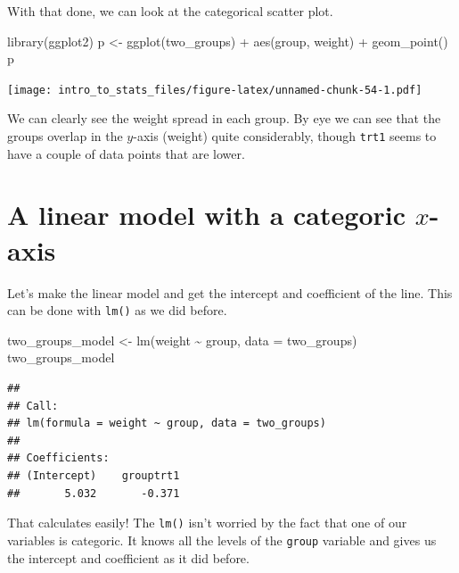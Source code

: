 \documentclass[
]{book}
\newenvironment{Shaded}{\begin{snugshade}}{\end{snugshade}}
\newcommand{\AttributeTok}[1]{\textcolor[rgb]{0.77,0.63,0.00}{#1}}
\newcommand{\FunctionTok}[1]{\textcolor[rgb]{0.00,0.00,0.00}{#1}}
\newcommand{\NormalTok}[1]{#1}
\newcommand{\OtherTok}[1]{\textcolor[rgb]{0.56,0.35,0.01}{#1}}
\newcommand{\SpecialCharTok}[1]{\textcolor[rgb]{0.00,0.00,0.00}{#1}}
\begin{document}
With that done, we can look at the categorical scatter plot.

\begin{Shaded}
\begin{Highlighting}[]
\FunctionTok{library}\NormalTok{(ggplot2)}
\NormalTok{p }\OtherTok{\textless{}{-}} \FunctionTok{ggplot}\NormalTok{(two\_groups) }\SpecialCharTok{+} \FunctionTok{aes}\NormalTok{(group, weight) }\SpecialCharTok{+} \FunctionTok{geom\_point}\NormalTok{()}
\NormalTok{p}
\end{Highlighting}
\end{Shaded}

\texttt{[image: intro\_to\_stats\_files/figure-latex/unnamed-chunk-54-1.pdf]}

We can clearly see the weight spread in each group. By eye we can see that the groups overlap in the \(y\)-axis (weight) quite considerably, though \texttt{trt1} seems to have a couple of data points that are lower.

\hypertarget{a-linear-model-with-a-categoric-x-axis}{%
\section{\texorpdfstring{A linear model with a categoric \(x\)-axis}{A linear model with a categoric x-axis}}\label{a-linear-model-with-a-categoric-x-axis}}

Let's make the linear model and get the intercept and coefficient of the line. This can be done with \texttt{lm()} as we did before.

\begin{Shaded}
\begin{Highlighting}[]
\NormalTok{two\_groups\_model }\OtherTok{\textless{}{-}} \FunctionTok{lm}\NormalTok{(weight }\SpecialCharTok{\textasciitilde{}}\NormalTok{ group, }\AttributeTok{data =}\NormalTok{ two\_groups)}
\NormalTok{two\_groups\_model}
\end{Highlighting}
\end{Shaded}

\begin{verbatim}
## 
## Call:
## lm(formula = weight ~ group, data = two_groups)
## 
## Coefficients:
## (Intercept)    grouptrt1  
##       5.032       -0.371
\end{verbatim}

That calculates easily! The \texttt{lm()} isn't worried by the fact that one of our variables is categoric. It knows all the levels of the \texttt{group} variable and gives us the intercept and coefficient as it did before.
\end{document}

